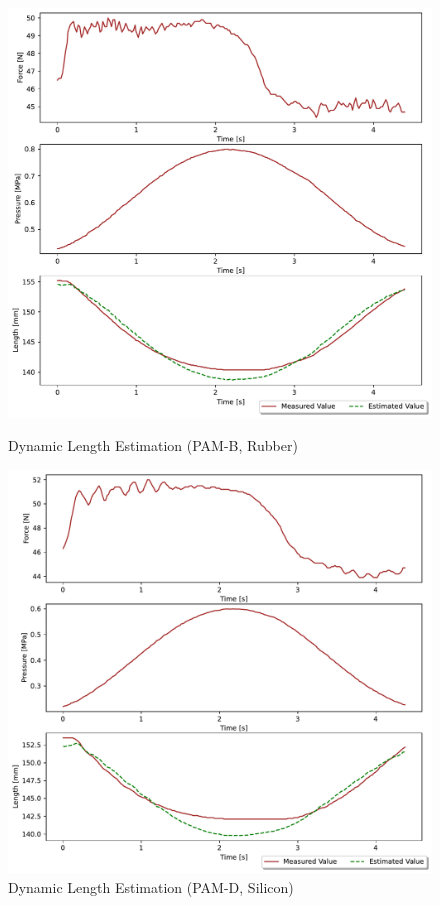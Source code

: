 \begin{figure}[h]
   \begin{center}
       \begin{minipage}[t]{\columnwidth} 
           \centering
           \includegraphics[keepaspectratio, width=\columnwidth]{fig/20231207_1_4s_by_5_2d_ieeesensors1.pdf}
           \caption{Dynamic Length Estimation (PAM-B, Rubber)}
           \label{fig:pam_b_dynamic}
       \end{minipage}
       \hfill
       \begin{minipage}[t]{\columnwidth} 
           \centering
           \includegraphics[keepaspectratio, width=\columnwidth]{fig/20231220_2_s_by_2_2d_ieeesensors1.pdf}
           \caption{Dynamic Length Estimation (PAM-D, Silicon)}
           \label{fig:pam_d_dynamic}
       \end{minipage}
   \end{center}
\end{figure}

